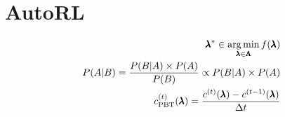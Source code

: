 \documentclass[]{article}
\DeclareMathOperator*{\argmax}{arg\,max}
\DeclareMathOperator*{\argmin}{arg\,min}
\begin{document}


\section{AutoRL}

\begin{eqnarray}
   \conf^* \in \argmin_{\conf \in \confs} f(\conf)\\
   P(A \vert B) = \frac{P(B \vert A) \times  P(A)}{P(B)} \propto P(B \vert A) \times  P(A)\\
   \cost_{\text{PBT}}^{(t)}(\conf)= \frac{\cost^{(t)}(\conf) - \cost^{(t-1)}(\conf)}{\Delta t}
\end{eqnarray}
\end{document}
